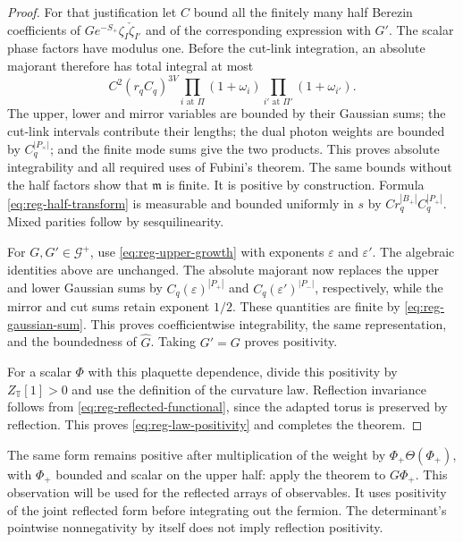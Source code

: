 \documentclass[11pt,letterpaper,reqno]{amsart}
\begin{document}
\begin{proof}
For that justification let $C$ bound all the finitely many half
Berezin coefficients of $G e^{-S_+}\zeta_I\check\zeta_{I'}$ and of
the corresponding expression with $G'$. The scalar phase factors
have modulus one. Before the cut-link integration, an absolute
majorant therefore has total integral at most
\begin{equation}\label{eq:reg-representation-majorant}
 C^2(r_qC_q)^{3V}
       \prod_{i\text{ at }\Pi}(1+\omega_i)
       \prod_{i'\text{ at }\Pi'}(1+\omega_{i'}).
\end{equation}
The upper, lower and mirror variables are bounded by their
Gaussian sums; the cut-link intervals contribute their lengths;
the dual photon weights are bounded by $C_q^{|P_\times|}$; and the
finite mode sums give the two products. This proves absolute
integrability and all required uses of Fubini's theorem. The
same bounds without the half factors show that $\mathfrak m$ is
finite. It is positive by construction. Formula
\eqref{eq:reg-half-transform} is measurable and bounded uniformly
in $s$ by $Cr_q^{|B_+|}C_q^{|P_+|}$. Mixed parities follow by
sesquilinearity.

For $G,G'\in\mathcal G^+$, use
\eqref{eq:reg-upper-growth} with exponents $\varepsilon$ and
$\varepsilon'$. The algebraic identities above are unchanged.
The absolute majorant now replaces the upper and lower Gaussian
sums by $C_q(\varepsilon)^{|P_+|}$ and
$C_q(\varepsilon')^{|P_-|}$, respectively, while the mirror and
cut sums retain exponent $1/2$. These quantities are finite by
\eqref{eq:reg-gaussian-sum}. This proves coefficientwise
integrability, the same representation, and the boundedness of
$\widehat G$. Taking $G'=G$ proves positivity.

For a scalar $\Phi$ with this plaquette dependence, divide this positivity
by $Z_{\mathbb T}[1]>0$ and use the definition of the curvature
law. Reflection invariance follows from
\eqref{eq:reg-reflected-functional}, since the adapted torus is
preserved by reflection. This proves
\eqref{eq:reg-law-positivity} and completes the theorem.
\end{proof}

The same form remains positive after multiplication of the weight
by $\Phi_+\Theta(\Phi_+)$, with $\Phi_+$ bounded and scalar on the
upper half: apply the theorem to $G\Phi_+$. This observation will
be used for the reflected arrays of observables. It uses positivity
of the joint reflected form before integrating out the fermion.
The determinant's pointwise nonnegativity by itself does not imply
reflection positivity.
\end{document}

